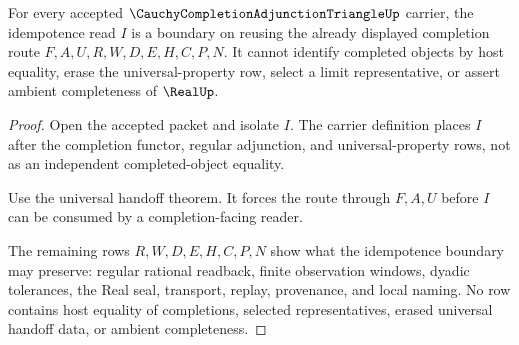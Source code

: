 \begin{theorem}
\label{thm:cauchy-completion-adjunction-triangle-idempotence-boundary}
For every accepted $\CauchyCompletionAdjunctionTriangleUp$ carrier, the idempotence read $I$ is a boundary on reusing the already displayed completion route $F,A,U,R,W,D,E,H,C,P,N$. It cannot identify completed objects by host equality, erase the universal-property row, select a limit representative, or assert ambient completeness of $\RealUp$.
\end{theorem}
\begin{proof}
Open the accepted packet and isolate $I$. The carrier definition places $I$ after the completion functor, regular adjunction, and universal-property rows, not as an independent completed-object equality.

Use the universal handoff theorem. It forces the route through $F,A,U$ before $I$ can be consumed by a completion-facing reader.

The remaining rows $R,W,D,E,H,C,P,N$ show what the idempotence boundary may preserve: regular rational readback, finite observation windows, dyadic tolerances, the Real seal, transport, replay, provenance, and local naming. No row contains host equality of completions, selected representatives, erased universal handoff data, or ambient completeness.
\end{proof}




